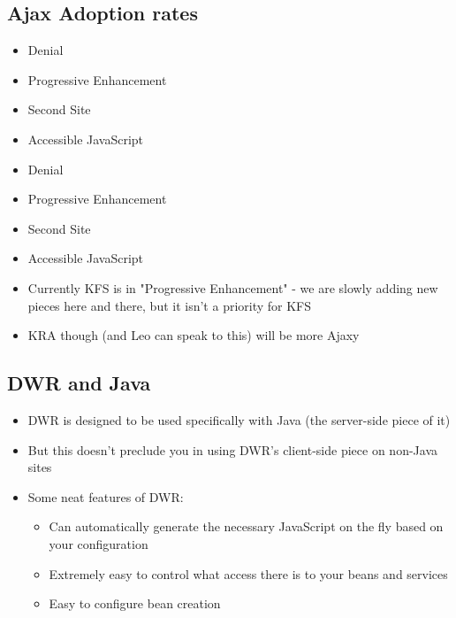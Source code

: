 \begin{ifhtml}
\begin{s5slide}
        \section{Ajax Adoption rates}
            \begin{itemize}
                \item Denial
                \item Progressive Enhancement
                \item Second Site
                \item Accessible JavaScript
            \end{itemize}
            \begin{s5notes}
                \begin{itemize}
                    \item Denial
                    \item Progressive Enhancement
                    \item Second Site
                    \item Accessible JavaScript
                \end{itemize}
                \begin{itemize}
                    \item Currently KFS is in "Progressive Enhancement" - we are slowly adding new pieces here and there, but it isn't a priority for KFS
                    \item KRA though (and Leo can speak to this) will be more Ajaxy
                \end{itemize}
            \end{s5notes}
    \end{s5slide}
    \begin{s5slide}
        \section{DWR and Java}
            \begin{itemize}
                \item DWR is designed to be used specifically with Java (the server-side piece of it)   
                \item But this doesn't preclude you in using DWR's client-side piece on non-Java sites
            \end{itemize}
            \begin{itemize}
                \item Some neat features of DWR:
                \begin{itemize}
                    \item Can automatically generate the necessary JavaScript on the fly based on your configuration
                    \item Extremely easy to control what access there is to your beans and services
                    \item Easy to configure bean creation
                \end{itemize}
            \end{itemize}
            

\end{s5slide}
\end{ifhtml}
